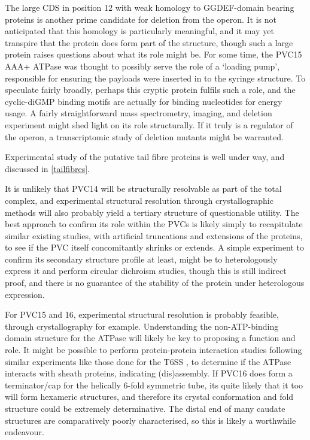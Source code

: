 The large CDS in position 12 with weak homology to GGDEF-domain bearing proteins is another prime candidate for deletion from the operon. It is not anticipated that this homology is particularly meaningful, and it may yet transpire that the protein does form part of the structure, though such a large protein raises questions about what its role might be. For some time, the PVC15 AAA+ ATPase was thought to possibly serve the role of a `loading pump', responsible for ensuring the payloads were inserted in to the syringe structure. To speculate fairly broadly, perhaps this cryptic protein fulfils such a role, and the cyclic-diGMP binding motifs are actually for binding nucleotides for energy usage. A fairly straightforward mass spectrometry, imaging, and deletion experiment might shed light on its role structurally. If it truly is a regulator of the operon, a transcriptomic study of deletion mutants might be warranted.

Experimental study of the putative tail fibre proteins is well under way, and discussed in \vref{tailfibres}.

It is unlikely that PVC14 will be structurally resolvable as part of the total complex, and experimental structural resolution through crystallographic methods will also probably yield a tertiary structure of questionable utility. The best approach to confirm its role within the PVCs is likely simply to recapitulate similar existing studies, with artificial truncations and extensions of the proteins, to see if the PVC itself concomitantly shrinks or extends. A simple experiment to confirm its secondary structure profile at least, might be to heterologously express it and perform circular dichroism studies, though this is still indirect proof, and there is no guarantee of the stability of the protein under heterologous expression.

For PVC15 and 16, experimental structural resolution is probably feasible, through crystallography for example. Understanding the non-ATP-binding domain structure for the ATPase will likely be key to proposing a function and role. It might be possible to perform protein-protein interaction studies following similar experiments like those done for the T6SS \citep{Douzi2016}, to determine if the ATPase interacts with sheath proteins, indicating (dis)assembly. If PVC16 does form a terminator/cap for the helically 6-fold symmetric tube, its quite likely that it too will form hexameric structures, and therefore its crystal conformation and fold structure could be extremely determinative. The distal end of many caudate structures are comparatively poorly characterised, so this is likely a worthwhile endeavour.



